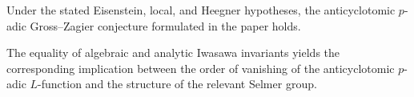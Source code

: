 \begin{theorem}
\label{anticyclotomic-iwasawa-rational-elliptic-eisenstein-main}
Under the stated Eisenstein, local, and Heegner hypotheses, the anticyclotomic $p$-adic Gross--Zagier conjecture formulated in the paper holds.
\notready
\end{theorem}

\begin{theorem}
\label{anticyclotomic-iwasawa-rational-elliptic-eisenstein-secondary}
The equality of algebraic and analytic Iwasawa invariants yields the corresponding implication between the order of vanishing of the anticyclotomic $p$-adic $L$-function and the structure of the relevant Selmer group.
\notready
\end{theorem}
